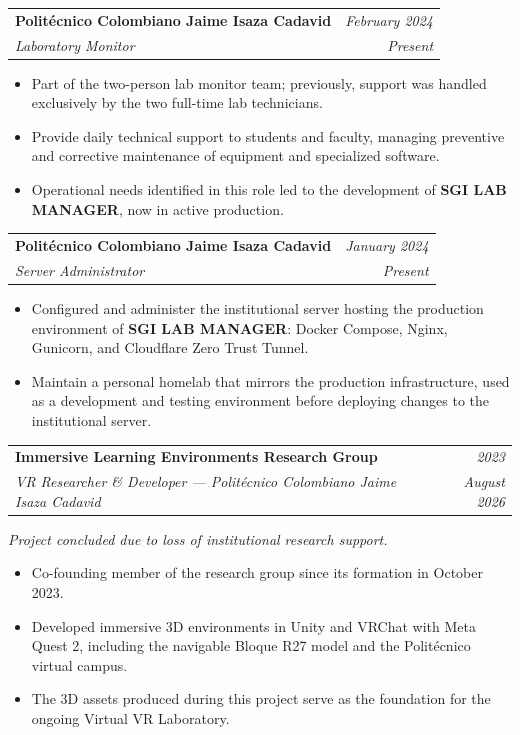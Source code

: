 \documentclass[11pt, a4paper]{article}
\makeatletter
\newcommand{\expentry}[4]{%
  \noindent
  \begin{tabularx}{\textwidth}{@{}X r@{}}
    \textbf{\color{primary}#1} & \textit{\small\color{darkgray}#3} \\
    \textit{\color{accent}#2}  & \textit{\small\color{darkgray}#4} \\
  \end{tabularx}%
}
\makeatother
\begin{document}
\vspace{6pt}
\expentry{Politécnico Colombiano Jaime Isaza Cadavid}{Laboratory Monitor}{February 2024}{Present}

\begin{itemize}
  \item Part of the two-person lab monitor team; previously, support was handled
        exclusively by the two full-time lab technicians.
  \item Provide daily technical support to students and faculty, managing preventive
        and corrective maintenance of equipment and specialized software.
  \item Operational needs identified in this role led to the development of
        \textbf{SGI LAB MANAGER}, now in active production.
\end{itemize}

\vspace{6pt}
\expentry{Politécnico Colombiano Jaime Isaza Cadavid}{Server Administrator}{January 2024}{Present}

\begin{itemize}
  \item Configured and administer the institutional server hosting the production
        environment of \textbf{SGI LAB MANAGER}: Docker Compose, Nginx, Gunicorn,
        and Cloudflare Zero Trust Tunnel.
  \item Maintain a personal homelab that mirrors the production infrastructure,
        used as a development and testing environment before deploying changes to
        the institutional server.
\end{itemize}

\vspace{6pt}
\expentry{Immersive Learning Environments Research Group}{VR Researcher \& Developer — Politécnico Colombiano Jaime Isaza Cadavid}{2023}{August 2026}

\textit{\small\color{darkgray}Project concluded due to loss of institutional research support.}

\begin{itemize}
  \item Co-founding member of the research group since its formation in October 2023.
  \item Developed immersive 3D environments in Unity and VRChat with Meta Quest 2,
        including the navigable Bloque R27 model and the Politécnico virtual campus.
  \item The 3D assets produced during this project serve as the foundation for the
        ongoing Virtual VR Laboratory.
\end{itemize}
\end{document}
